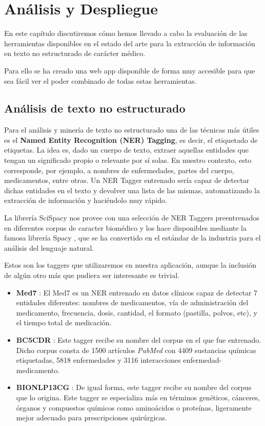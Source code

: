 \chapter{Análisis y Despliegue}

En este capítulo discutiremos cómo hemos llevado a cabo la evaluación de las herramientas disponibles en el estado del arte para la extracción de información en texto no estructurado de carácter médico.

Para ello se ha creado una web app disponible de forma muy accesible para que sea fácil ver el poder combinado de todas estas herramientas.

\section{Análisis de texto no estructurado}

Para el análisis y minería de texto no estructurado una de las técnicas más útiles es el \textbf{Named Entity Recognition (NER) Tagging}, es decir, el etiquetado de etiquetas. La idea es, dado un cuerpo de texto, extraer aquellas entidades que tengan un significado propio o relevante por sí solas. En nuestro contexto, esto corresponde, por ejemplo, a nombres de enfermedades, partes del cuerpo, medicamentos, entre otras. Un NER Tagger entrenado sería capaz de detectar dichas entidades en el texto y devolver una lista de las mismas, automatizando la extracción de información y haciéndolo muy rápido.

La librería SciSpacy \cite{neumann-etal-2019-scispacy} nos provee con una selección de NER Taggers preentrenados en diferentes corpus de caracter biomédico y los hace disponibles mediante la famosa librería Spacy \cite{spacy}, que se ha convertido en el estándar de la industria para el análisis del lenguaje natural.

Estos son los taggers que utilizaremos en nuestra aplicación, aunque la inclusión de algún otro más que pudiera ser interesante es trivial. 

\begin{itemize}
	\item \textbf{Med7} \cite{med7}: El Med7 es un NER entrenado en datos clínicos capaz de detectar 7 entidades diferentes: nombres de medicamentos, vía de administración del medicamento, frecuencia, dosis, cantidad, el formato (pastilla, polvos, etc), y el tiempo total de medicación. 
	\item \textbf{BC5CDR} \cite{bc5cdr}: Este tagger recibe su nombre del corpus en el que fue entrenado. Dicho corpus consta de 1500 artículos \textit{PubMed} con 4409 sustancias químicas etiquetadas, 5818 enfermedades y 3116 interacciones enfermedad-medicamento.
	\item \textbf{BIONLP13CG} \cite{BIONLP13CG}: De igual forma, este tagger recibe su nombre del corpus que lo origina. Este tagger se especializa más en términos genéticos, cánceres, órganos y compuestos químicos como aminoácidos o proteínas, ligeramente mejor adecuado para prescripciones quirúrgicas.
\end{itemize}

